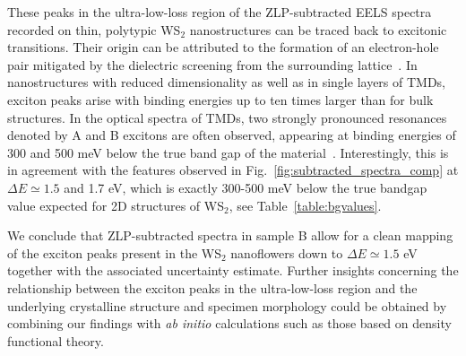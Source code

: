 These peaks in the ultra-low-loss region of the ZLP-subtracted EELS spectra recorded on thin, polytypic
WS$_2$ nanostructures can be traced back to excitonic transitions.
%
Their origin can be attributed to the formation of an electron-hole pair mitigated
by the dielectric screening from the surrounding lattice~\cite{Hanbicki:2016}.
%
In nanostructures with reduced dimensionality as well as in single layers of TMDs, 
exciton peaks arise with binding energies
up to ten times larger than for bulk structures.
%
In the optical spectra of TMDs, two strongly pronounced resonances denoted by A and B
excitons are often observed, appearing at binding energies of 300 and
500 meV below the true band gap of the material~\cite{Karivaj:2019}.
%
Interestingly, this is in agreement with the features observed in Fig.~\ref{fig:subtracted_spectra_comp} at 
$\Delta E\simeq 1.5$ and 1.7 eV, which is exactly 300-500 meV below the true bandgap value
expected for 2D structures of WS$_2$, see Table~\ref{table:bgvalues}.  

We  conclude that ZLP-subtracted spectra in sample B allow for
a clean mapping of the exciton peaks present in the WS$_2$ nanoflowers
down to $\Delta E\simeq 1.5$ eV together with
the associated uncertainty estimate.
%
Further insights concerning the relationship between the exciton peaks in the ultra-low-loss region
and the underlying crystalline structure and specimen morphology could be obtained
by combining our findings with {\it ab initio} calculations such as those based on
density functional theory.


